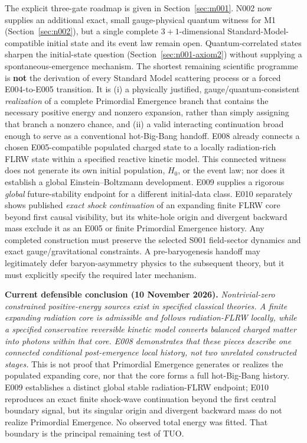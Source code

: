 \documentclass[11pt,a4paper]{article}
\theoremstyle{tmon}
\theoremstyle{definition}
\begin{document}
The explicit three-gate roadmap is given in Section~\ref{sec:m001}. N002 now supplies an additional exact, small gauge-physical quantum witness for M1 (Section~\ref{sec:n002}), but a single complete $3+1$-dimensional Standard-Model-compatible initial state and its event law remain open. Quantum-correlated states sharpen the initial-state question (Section~\ref{sec:n001-axiom2}) without supplying a spontaneous-emergence mechanism. The shortest remaining scientific programme is \textbf{not} the derivation of every Standard Model scattering process or a forced E004-to-E005 transition. It is (i) a physically justified, gauge/quantum-consistent \emph{realization} of a complete Primordial Emergence branch that contains the necessary positive energy and nonzero expansion, rather than simply assigning that branch a nonzero chance, and (ii) a valid interacting continuation broad enough to serve as a conventional hot-Big-Bang handoff. E008 already connects a chosen E005-compatible populated charged state to a locally radiation-rich FLRW state within a specified reactive kinetic model. This connected witness does not generate its own initial population, $H_0$, or the event law; nor does it establish a global Einstein--Boltzmann development. E009 supplies a rigorous \emph{global} future-stability endpoint for a different initial-data class. E010 separately shows published \emph{exact shock continuation} of an expanding finite FLRW core beyond first causal visibility, but its white-hole origin and divergent backward mass exclude it as an E005 or finite Primordial Emergence history. Any completed construction must preserve the selected S001 field-sector dynamics and exact gauge/gravitational constraints. A pre-baryogenesis handoff may legitimately defer baryon-asymmetry physics to the subsequent theory, but it must explicitly specify the required later mechanism.

\begin{keybox}
\textbf{Current defensible conclusion (10 November 2026).} \emph{Nontrivial-zero constrained positive-energy sources exist in specified classical theories. A finite expanding radiation core is admissible and follows radiation-FLRW locally, while a specified conservative reversible kinetic model converts balanced charged matter into photons within that core. E008 demonstrates that these pieces describe one connected \emph{conditional post-emergence local history}, not two unrelated constructed stages.} This is not proof that Primordial Emergence generates or realizes the populated expanding core, nor that the core forms a full hot-Big-Bang history. E009 establishes a distinct global stable radiation-FLRW endpoint; E010 reproduces an exact finite shock-wave continuation beyond the first central boundary signal, but its singular origin and divergent backward mass do not realize Primordial Emergence. No observed total energy was fitted. That boundary is the principal remaining test of TUO.
\end{keybox}
\end{document}
